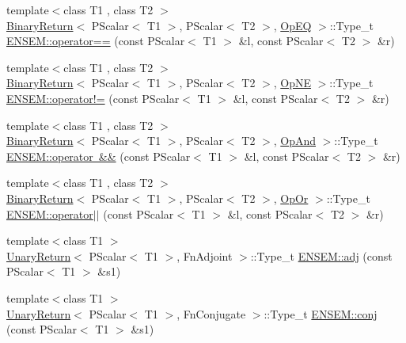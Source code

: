 \begin{DoxyCompactItemize}
\item 
{\footnotesize template$<$class T1 , class T2 $>$ }\\\mbox{\hyperlink{structBinaryReturn}{Binary\+Return}}$<$ P\+Scalar$<$ T1 $>$, P\+Scalar$<$ T2 $>$, \mbox{\hyperlink{structOpEQ}{Op\+EQ}} $>$\+::Type\+\_\+t \mbox{\hyperlink{group__primscalar_ga2834c2d31221ad19c3251f77a4b404f4}{E\+N\+S\+E\+M\+::operator==}} (const P\+Scalar$<$ T1 $>$ \&l, const P\+Scalar$<$ T2 $>$ \&r)
\item 
{\footnotesize template$<$class T1 , class T2 $>$ }\\\mbox{\hyperlink{structBinaryReturn}{Binary\+Return}}$<$ P\+Scalar$<$ T1 $>$, P\+Scalar$<$ T2 $>$, \mbox{\hyperlink{structOpNE}{Op\+NE}} $>$\+::Type\+\_\+t \mbox{\hyperlink{group__primscalar_ga684a2a9e7e4ca7bc1f740a291a847808}{E\+N\+S\+E\+M\+::operator!=}} (const P\+Scalar$<$ T1 $>$ \&l, const P\+Scalar$<$ T2 $>$ \&r)
\item 
{\footnotesize template$<$class T1 , class T2 $>$ }\\\mbox{\hyperlink{structBinaryReturn}{Binary\+Return}}$<$ P\+Scalar$<$ T1 $>$, P\+Scalar$<$ T2 $>$, \mbox{\hyperlink{structOpAnd}{Op\+And}} $>$\+::Type\+\_\+t \mbox{\hyperlink{group__primscalar_ga3853388d3b3d994d263d1da57ffcb055}{E\+N\+S\+E\+M\+::operator \&\&}} (const P\+Scalar$<$ T1 $>$ \&l, const P\+Scalar$<$ T2 $>$ \&r)
\item 
{\footnotesize template$<$class T1 , class T2 $>$ }\\\mbox{\hyperlink{structBinaryReturn}{Binary\+Return}}$<$ P\+Scalar$<$ T1 $>$, P\+Scalar$<$ T2 $>$, \mbox{\hyperlink{structOpOr}{Op\+Or}} $>$\+::Type\+\_\+t \mbox{\hyperlink{group__primscalar_ga7955d37fbeaea4b15d725326bfcbc0b1}{E\+N\+S\+E\+M\+::operator$\vert$$\vert$}} (const P\+Scalar$<$ T1 $>$ \&l, const P\+Scalar$<$ T2 $>$ \&r)
\item 
{\footnotesize template$<$class T1 $>$ }\\\mbox{\hyperlink{structUnaryReturn}{Unary\+Return}}$<$ P\+Scalar$<$ T1 $>$, Fn\+Adjoint $>$\+::Type\+\_\+t \mbox{\hyperlink{group__primscalar_ga7014b73d255c4b57001dd68abf3a51c3}{E\+N\+S\+E\+M\+::adj}} (const P\+Scalar$<$ T1 $>$ \&s1)
\item 
{\footnotesize template$<$class T1 $>$ }\\\mbox{\hyperlink{structUnaryReturn}{Unary\+Return}}$<$ P\+Scalar$<$ T1 $>$, Fn\+Conjugate $>$\+::Type\+\_\+t \mbox{\hyperlink{group__primscalar_ga751a721817d2276b8eeda384b67ffa2a}{E\+N\+S\+E\+M\+::conj}} (const P\+Scalar$<$ T1 $>$ \&s1)
\item 

\end{DoxyCompactItemize}
